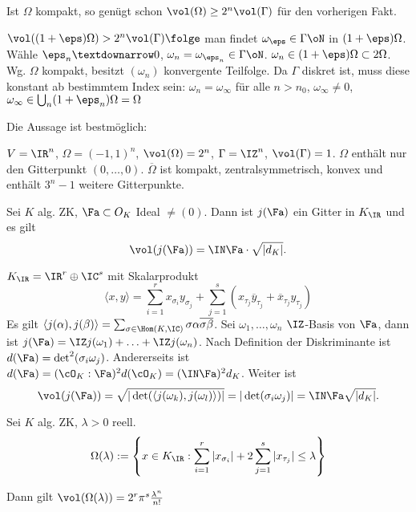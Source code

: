 \begin{Folgerung}
 Ist $\Omega$ kompakt, so genügt schon $\vol(\Omega)\geq 2^n\vol(\Gamma)$ für den vorherigen Fakt.
\end{Folgerung}

\begin{Beweis}
 $\vol((1+\eps)\Omega)>2^n\vol(\Gamma)\folge$ man findet $\omega_\eps\in\Gamma\oN$ in $(1+\eps)\Omega$. Wähle $\eps_n\textdownarrow 0$, $\omega_n=\omega_{\eps_n}\in\Gamma\oN$. $\omega_n\in(1+\eps)\Omega\subset 2\Omega$. Wg. $\Omega$ kompakt, besitzt $(\omega_n)$ konvergente Teilfolge. Da $\Gamma$ diskret ist, muss diese konstant ab bestimmtem Index sein: $\omega_n=\omega_\infty$ für alle $n>n_0$, $\omega_\infty\neq 0$, $\omega_\infty\in \bigcup_n(1+\eps_n)\Omega=\Omega$
\end{Beweis}


\begin{Bemerkung}
 Die Aussage ist bestmöglich:
 
 $V=\IR^n$, $\Omega=(-1,1)^n$, $\vol(\Omega)=2^n$, $\Gamma=\IZ^n$, $\vol(\Gamma)=1$. $\Omega$ enthält nur den Gitterpunkt $(0,\ldots,0)$. $\overline{\Omega}$ ist kompakt, zentralsymmetrisch, konvex und enthält $3^n-1$ weitere Gitterpunkte.
\end{Bemerkung}

\begin{Fakt}
 Sei $K$ alg. ZK, $\Fa\subset O_K$ Ideal $\neq(0)$. Dann ist $j(\Fa)$ ein Gitter in $K_\IR$ und es gilt \[ \vol(j(\Fa))=\IN\Fa\cdot \sqrt{|d_K|}.\]
\end{Fakt}

\begin{Beweis}
 $K_\IR=\IR^r \oplus \IC^s$ mit Skalarprodukt \[\langle x,y\rangle = \sum_{i=1}^r x_{\sigma_i}y_{\sigma_j}+ \sum_{j=1}^s(x_{\tau_j}\overline{y}_{\tau_j}+\overline{x}_{\tau_j}{y}_{\tau_j}) \]
 Es gilt $\langle j(\alpha),j(\beta)\rangle=\sum_{\sigma\in\Hom(K,\IC)}\sigma\alpha\overline{\sigma\beta}$. Sei $\omega_1,\ldots,\omega_n$ $\IZ$-Basis von $\Fa$, dann ist $j(\Fa)=\IZ j(\omega_1)+\ldots +\IZ j(\omega_n)$. Nach Definition der Diskriminante ist $d(\Fa)=\det^2(\sigma_i\omega_j)$. Andererseits ist $d(\Fa)=(\cO_K:\Fa)^2d(\cO_K)=(\IN\Fa)^2d_K$. Weiter ist
 \[ \vol(j(\Fa))=\sqrt{|\det(\langle j(\omega_k),j(\omega_l)\rangle)|}=|\det(\sigma_i\omega_j)|=\IN\Fa\sqrt{|d_K|}.\]
\end{Beweis}

\begin{Lemma}
 Sei $K$ alg. ZK, $\lambda>0$ reell. 
 \[ \Omega(\lambda):=\left\{ x\in K_\IR: \sum_{i=1}^r |x_{\sigma_i}| + 2\sum_{j=1}^s |x_{\tau_j}|\leq \lambda\right\}\]
 
 Dann gilt $\vol(\Omega(\lambda))=2^r\pi^s\frac{\lambda^n}{n!}$
\end{Lemma}

